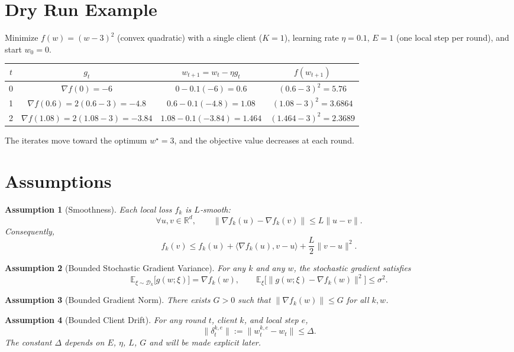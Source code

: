 \documentclass{article}
\newcommand{\E}{\mathbb{E}}
\newcommand{\R}{\mathbb{R}}
\newtheorem{assumption}{Assumption}
\begin{document}
\section*{Dry Run Example}
Minimize $f(w)=(w-3)^2$ (convex quadratic) with a single client ($K=1$),
learning rate $\eta=0.1$, $E=1$ (one local step per round), and start $w_0=0$.

\begin{center}
\begin{tabular}{c|c|c|c}
$t$ & $g_t$ & $w_{t+1}=w_t-\eta g_t$ & $f(w_{t+1})$\\ \hline
0 & $\nabla f(0)= -6$ & $0-0.1(-6)=0.6$ & $(0.6-3)^2=5.76$\\
1 & $\nabla f(0.6)=2(0.6-3)=-4.8$ & $0.6-0.1(-4.8)=1.08$ & $(1.08-3)^2=3.6864$\\
2 & $\nabla f(1.08)=2(1.08-3)=-3.84$ & $1.08-0.1(-3.84)=1.464$ & $(1.464-3)^2=2.3689$\\
\end{tabular}
\end{center}
The iterates move toward the optimum $w^\star=3$, and the objective value
decreases at each round.

\newpage

\section*{Assumptions}
\begin{assumption}[Smoothness]\label{ass:smooth}
Each local loss $f_k$ is $L$‑smooth:
\[
\forall u,v\in\R^d,\qquad 
\|\nabla f_k(u)-\nabla f_k(v)\|\le L\|u-v\|.
\]
Consequently,
\[
f_k(v)\le f_k(u)+\langle\nabla f_k(u),v-u\rangle+\frac{L}{2}\|v-u\|^2 .
\]
\end{assumption}

\begin{assumption}[Bounded Stochastic Gradient Variance]\label{ass:var}
For any $k$ and any $w$, the stochastic gradient satisfies
\[
\E_{\xi\sim\mathcal{D}_k}\!\big[g(w;\xi)\big]=\nabla f_k(w),\qquad
\E_{\xi}\!\big[\|g(w;\xi)-\nabla f_k(w)\|^2\big]\le\sigma^2 .
\]
\end{assumption}

\begin{assumption}[Bounded Gradient Norm]\label{ass:grad}
There exists $G>0$ such that $\|\nabla f_k(w)\|\le G$ for all $k,w$.
\end{assumption}

\begin{assumption}[Bounded Client Drift]\label{ass:drift}
For any round $t$, client $k$, and local step $e$,
\[
\|\delta_{t}^{k,e}\|:=\|w_{t}^{k,e}-w_t\|\le \Delta .
\]
The constant $\Delta$ depends on $E$, $\eta$, $L$, $G$ and will be made explicit later.
\end{assumption}
\end{document}
